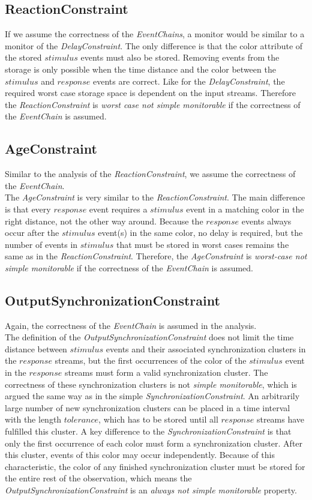 \subsection{ReactionConstraint}
	If we assume the correctness of the \textit{EventChains}, a monitor would be similar to a monitor of the \textit{DelayConstraint}. The only difference is that the color attribute of the stored $stimulus$ events must also be stored. Removing events from the storage is only possible when the time distance and the color between the $stimulus$ and $response$ events are correct.  Like for the \textit{DelayConstraint}, the required worst case storage space is dependent on the input streams. Therefore the \textit{ReactionConstraint} is \textit{worst case not simple monitorable} if the correctness of the \textit{EventChain} is assumed.

\subsection{AgeConstraint}
	Similar to the analysis of the \textit{ReactionConstraint}, we assume the correctness of the \textit{EventChain}.\\
	The \textit{AgeConstraint} is very similar to the \textit{ReactionConstraint}. The main difference is that every $response$ event requires a $stimulus$ event in a matching color in the right distance, not the other way around. Because the $response$ events always occur after the $stimulus$ event(s) in the same color, no delay is required, but the number of events in $stimulus$ that must be stored in worst cases remains the same as in the \textit{ReactionConstraint}. Therefore, the \textit{AgeConstraint} is \textit{worst-case not simple monitorable} if the correctness of the \textit{EventChain} is assumed.
	
\subsection{OutputSynchronizationConstraint}
	Again, the correctness of the \textit{EventChain} is assumed in the analysis.\\
	The definition of the \textit{OutputSynchronizationConstraint} does not limit the time distance between $stimulus$ events and their associated synchronization clusters in the $response$ streams, but the first occurrences of the color of the $stimulus$ event in the $response$ streams must form a valid synchronization cluster. The correctness of these synchronization clusters is not \textit{simple monitorable}, which is argued the same way as in the simple \textit{SynchronizationConstraint}. An arbitrarily large number of new synchronization clusters can be placed in a time interval with the length $tolerance$, which has to be stored until all $response$ streams have fulfilled this cluster. A key difference to the \textit{SynchronizationConstraint} is that only the first occurrence of each color must form a synchronization cluster. After this cluster, events of this color may occur independently. Because of this characteristic, the color of any finished synchronization cluster must be stored for the entire rest of the observation, which means the \textit{OutputSynchronizationConstraint} is an \textit{always not simple monitorable} property.
	

